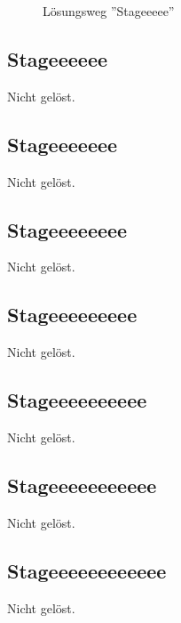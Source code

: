 \documentclass[12pt, a4paper, titlepage, oneside]{scrartcl}
\begin{document}
	\begin{figure}[h!]
		\centering
		\caption{Lösungsweg ''Stageeeee''}
		\label{fig:stageeeee_solution}
	\end{figure}

	\newpage

	\subsection{Stageeeeee}
	Nicht gelöst.

	\subsection{Stageeeeeee}
	Nicht gelöst.

	\subsection{Stageeeeeeee}
	Nicht gelöst.

	\subsection{Stageeeeeeeee}
	Nicht gelöst.

	\subsection{Stageeeeeeeeee}
	Nicht gelöst.

	\subsection{Stageeeeeeeeeee}
	Nicht gelöst.

	\subsection{Stageeeeeeeeeeee}
	Nicht gelöst.
\end{document}
